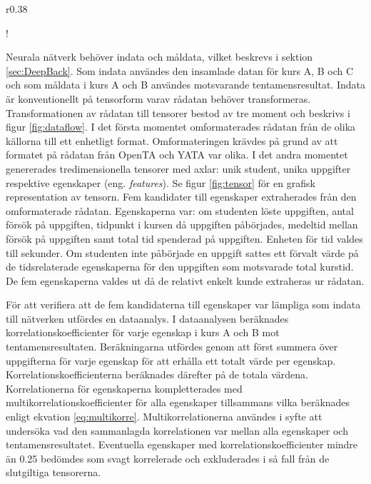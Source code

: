 \begin{wrapfigure}{r}{0.38\textwidth}
  \begin{center}
    \resizebox {0.38\textwidth} {!} {
        
    }
  \end{center}
  \caption{Ett flödesdiagram över databehandlings- och analysmetodiken. Notera att genereringen av tensorn är återkopplad via dataanalys.}
  \label{fig:dataflow}
\end{wrapfigure}

Neurala nätverk behöver indata och måldata, vilket beskrevs i sektion \ref{sec:DeepBack}. Som indata användes den insamlade datan för kurs A, B och C och som måldata i kurs A och B användes motsvarande tentamensresultat. Indata är konventionellt på tensorform \cite{Chollet} varav rådatan behöver transformeras. Transformationen av rådatan till tensorer bestod av tre moment och beskrivs i figur \ref{fig:dataflow}. I det första momentet omformaterades rådatan från de olika källorna till ett enhetligt format. Omformateringen krävdes på grund av att formatet på rådatan från OpenTA och YATA var olika. I det andra momentet genererades tredimensionella tensorer med axlar: unik student, unika uppgifter respektive egenskaper (eng. \textit{features}). Se figur \ref{fig:tensor} för en grafisk representation av tensorn. Fem kandidater till egenskaper extraherades från den omformaterade rådatan. Egenskaperna var: om studenten löste uppgiften, antal försök på uppgiften, tidpunkt i kursen då uppgiften påbörjades, medeltid mellan försök på uppgiften samt total tid spenderad på uppgiften. Enheten för tid valdes till sekunder. Om studenten inte påbörjade en uppgift sattes ett förvalt värde på de tidsrelaterade egenskaperna för den uppgiften som motsvarade total kurstid. De fem egenskaperna valdes ut då de relativt enkelt kunde extraheras ur rådatan.

För att verifiera att de fem kandidaterna till egenskaper var lämpliga som indata till nätverken utfördes en dataanalys. I dataanalysen beräknades korrelationskoefficienter för varje egenskap i kurs A och B mot tentamensresultaten. Beräkningarna utfördes genom att först summera över uppgifterna för varje egenskap för att erhålla ett totalt värde per egenskap. Korrelationskoefficienterna beräknades därefter på de totala värdena. Korrelationerna för egenskaperna kompletterades med multikorrelationskoefficienter för alla egenskaper tillsammans vilka beräknades enligt ekvation \eqref{eq:multikorre}. Multikorrelationerna användes i syfte att undersöka vad den sammanlagda korrelationen var mellan alla egenskaper och tentamensresultatet. Eventuella egenskaper med korrelationskoefficienter mindre än 0.25 bedömdes som svagt korrelerade \cite{ProbStat} och exkluderades i så fall från de slutgiltiga tensorerna. 


